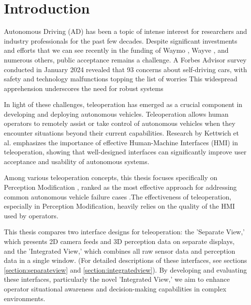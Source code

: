 
\chapter{Introduction}\label{chapter:introduction}

Autonomous Driving (AD) has been a topic of intense interest for researchers and
industry professionals for the past few decades. Despite significant investments and
efforts that we can see recently in the funding of Waymo \cite{waymo2024funding}, Wayve \cite{wayve2024funding},
and numerous others, public acceptance remains a challenge. A Forbes Advisor
survey \cite{forbes2024} conducted in January 2024 revealed that 93%
concerns about self-driving cars, with safety and technology malfunctions topping the
list of worries
This widespread apprehension underscores the need for robust systems

In light of these challenges, teleoperation has emerged as a crucial component
in developing and deploying autonomous vehicles. Teleoperation allows
human operators to remotely assist or take control of autonomous vehicles when they
encounter situations beyond their current capabilities. Research by Kettwich et al. \cite{Kettwich}
emphasizes the importance of effective Human-Machine Interfaces (HMI) in
teleoperation, showing that well-designed interfaces can significantly improve user
acceptance and usability of autonomous systems.

Among various teleoperation concepts, this thesis focuses specifically on Perception Modification \cite{Feiler2021ThePM},
ranked as the most effective approach for
addressing common autonomous vehicle failure cases \cite{Brecht} .The effectiveness of
teleoperation, especially in Perception Modification, heavily relies on the quality of the HMI used by operators.

This thesis compares two interface designs for teleoperation: the 'Separate View,'
which presents 2D camera feeds and 3D perception data on separate displays, and
the 'Integrated View,' which combines all raw sensor data and perception data in a single window.
(For detailed descriptions of these interfaces, see sections \ref{section:separateview} and \ref{section:integratedview}).
By developing and evaluating these interfaces, particularly the novel 'Integrated View,'
we aim to enhance operator situational awareness and decision-making capabilities in complex environments.

